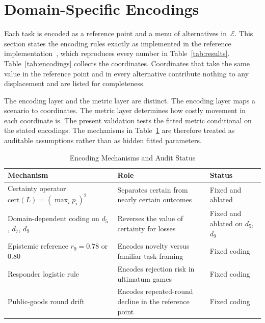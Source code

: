 \documentclass[journal]{IEEEtran}
\newcommand{\E}{\mathcal{E}}               %
\begin{document}
\section{Domain-Specific Encodings}
\label{sec:encoding}

Each task is encoded as a reference point and a menu of alternatives in~$\E$.
This section states the encoding rules exactly as implemented in the reference implementation~\cite{eriseconsw}, which reproduces every number in Table~\ref{tab:results}.
Table~\ref{tab:encodings} collects the coordinates.
Coordinates that take the same value in the reference point and in every alternative contribute nothing to any displacement and are listed for completeness.

The encoding layer and the metric layer are distinct.
The encoding layer maps a scenario to coordinates.
The metric layer determines how costly movement in each coordinate is.
The present validation tests the fitted metric conditional on the stated encodings.
The mechanisms in Table~\ref{tab:encoding_audit} are therefore treated as auditable assumptions rather than as hidden fitted parameters.

\begin{table}[!t]
\renewcommand{\arraystretch}{1.12}
\caption{Encoding Mechanisms and Audit Status}
\label{tab:encoding_audit}
\centering
\begin{tabular}{@{}p{} p{} p{}@{}}
\toprule
\textbf{Mechanism} & \textbf{Role} & \textbf{Status} \\
\midrule
Certainty operator $\mathrm{cert}(L)=(\max_i p_i)^2$ & Separates certain from nearly certain outcomes & Fixed and ablated \\
Domain-dependent coding on $d_5$, $d_7$, $d_9$ & Reverses the value of certainty for losses & Fixed and ablated on $d_5$, $d_9$ \\
Epistemic reference $r_9=0.78$ or $0.80$ & Encodes novelty versus familiar task framing & Fixed coding \\
Responder logistic rule & Encodes rejection risk in ultimatum games & Fixed coding \\
Public-goods round drift & Encodes repeated-round decline in the reference point & Fixed coding \\
\bottomrule
\end{tabular}
\end{table}
\end{document}
